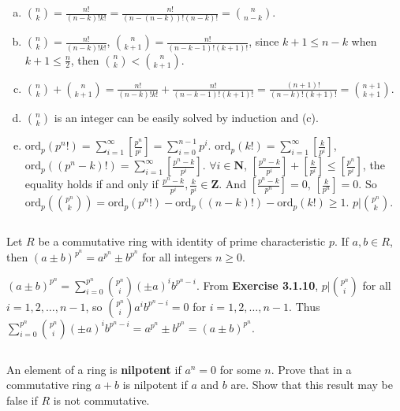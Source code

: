 \begin{enumerate}[(a)]
    \item $\binom{n}{k}=\frac{n!}{(n-k)!k!}=\frac{n!}{(n-(n-k))!(n-k)!}=\binom{n}{n-k}$.
    \item $\binom{n}{k}=\frac{n!}{(n-k)!k!}$, $\binom{n}{k+1}=\frac{n!}{(n-k-1)!(k+1)!}$, since $k+1\leq n-k$ when $k+1\leq \frac{n}{2}$, then $\binom{n}{k}<\binom{n}{k+1}$.
    \item $\binom{n}{k}+\binom{n}{k+1}=\frac{n!}{(n-k)!k!}+\frac{n!}{(n-k-1)!(k+1)!}=\frac{(n+1)!}{(n-k)!(k+1)!}=\binom{n+1}{k+1}$.
    \item $\binom{n}{k}$ is an integer can be easily solved by induction and (c).
    \item $\mathrm{ord}_{p}(p^{n}!)=\sum\limits_{i=1}^{\infty}\left[\frac{p^{n}}{p^{i}}\right]=\sum\limits_{i=0}^{n-1}p^{i}$. $\mathrm{ord}_{p}(k!)=\sum\limits_{i=1}^{\infty}\left[\frac{k}{p^{i}}\right]$, $\mathrm{ord}_{p}((p^{n}-k)!)=\sum\limits_{i=1}^{\infty}\left[\frac{p^{n}-k}{p^{i}}\right]$. $\forall i\in\mathbf{N}$, $\left[\frac{p^{n}-k}{p^{i}}\right]+\left[\frac{k}{p^{i}}\right]\leq \left[\frac{p^{n}}{p^{i}}\right]$, the equality holds if and only if $\frac{p^{n}-k}{p^{i}}, \frac{k}{p^{i}}\in \mathbf{Z}$. And $\left[\frac{p^{n}-k}{p^{n}}\right]=0$, $\left[\frac{k}{p^{n}}\right]=0$. So $\mathrm{ord}_{p}(\binom{p^{n}}{k})=\mathrm{ord}_{p}(p^{n}!)-\mathrm{ord}_{p}((n-k)!)-\mathrm{ord}_{p}(k!)\geq 1$. $p|\binom{p^{n}}{k}$.
\end{enumerate}

$$ $$

\begin{ex}
    Let $R$ be a commutative ring with identity of prime characteristic $p$. If $a, b\in R$, then $(a\pm b)^{p^{n}}=a^{p^{n}}\pm b^{p^{n}}$ for all integers $n\geq 0$.
\end{ex}

\begin{answer}
    $(a\pm b)^{p^{n}}=\sum\limits_{i=0}^{p^{n}}\binom{p^{n}}{i}(\pm a)^{i}b^{p^{n}-i}$. From \textbf{Exercise 3.1.10}, $p|\binom{p^{n}}{i}$ for all $i=1,2,\dots, n-1$, so $\binom{p^{n}}{i}a^{i}b^{p^{n}-i}=0$ for $i=1,2,\dots, n-1$. Thus $\sum\limits_{i=0}^{p^{n}}\binom{p^{n}}{i}(\pm a)^{i}b^{p^{n}-i}=a^{p^{n}}\pm b^{p^{n}}=(a\pm b)^{p^{n}}$.
\end{answer}

$$ $$

\begin{ex}
    An element of a ring is \textbf{nilpotent} if $a^{n}=0$ for some $n$. Prove that in a commutative ring $a+b$ is nilpotent if $a$ and $b$ are. Show that this result may be false if $R$ is not commutative.
\end{ex}

